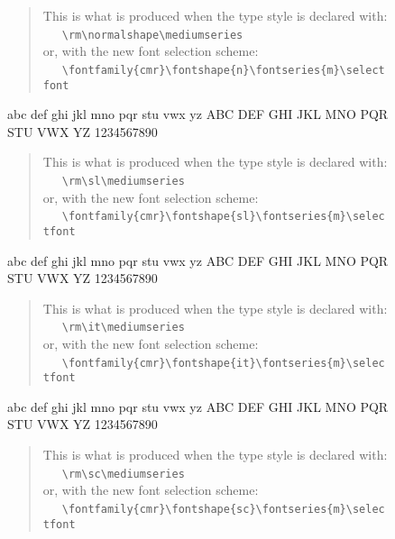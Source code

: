 \begin{figure}
\begin{singlespace}
\begin{verse}
This is what is produced when the type style is declared with:\\
\ \ \ \verb+\rm\normalshape\mediumseries+\\
or, with the new font selection scheme:\\
\ \ \ \verb+\fontfamily{cmr}\fontshape{n}\fontseries{m}\selectfont+
\end{verse}
{\selectfont
abc def ghi jkl mno pqr stu vwx yz ABC DEF GHI JKL MNO PQR STU
VWX YZ 1234567890}\par
\vspace{1em}
\begin{verse}
This is what is produced when the type  style is declared with:\\
\ \ \ \verb+\rm\sl\mediumseries+\\
or, with the new font selection scheme:\\
\ \ \ \verb+\fontfamily{cmr}\fontshape{sl}\fontseries{m}\selectfont+\\
\end{verse}
{\selectfont
abc def ghi jkl mno pqr stu vwx yz ABC DEF GHI JKL MNO PQR STU
VWX YZ 1234567890}\par
\vspace{1em}
\begin{verse}
This is what is produced when the type  style is declared with:\\
\ \ \ \verb+\rm\it\mediumseries+\\
or, with the new font selection scheme:\\
\ \ \ \verb+\fontfamily{cmr}\fontshape{it}\fontseries{m}\selectfont+
\end{verse}
{\selectfont
abc def ghi jkl mno pqr stu vwx yz ABC DEF GHI JKL MNO PQR STU
VWX YZ 1234567890}\par
\vspace{1em}
\begin{verse}
This is what is produced when the type style is declared with:\\
\ \ \ \verb+\rm\sc\mediumseries+\\
or, with the new font selection scheme:\\
\ \ \ \verb+\fontfamily{cmr}\fontshape{sc}\fontseries{m}\selectfont+
\end{verse}

\end{singlespace}
\end{figure}
